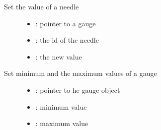 \documentclass[letterpaper,10pt,english]{sphinxmanual}
\begin{document}

\begin{fulllineitems}
\label{\detokenize{object-types/gauge:_CPPv418lv_gauge_set_valueP8lv_obj_t7uint8_t7int16_t}}%
\pysigstartmultiline
{}\label{\detokenize{object-types/gauge:lv__gauge_8h_1aa3847d9ed79b0bfeada84ff2b1029de3}}%
\pysigstopmultiline
Set the value of a needle \begin{description}
\item[{}] \leavevmode\begin{itemize}
\item {} 
: pointer to a gauge 

\item {} 
: the id of the needle 

\item {} 
: the new value 

\end{itemize}

\end{description}


\end{fulllineitems}


\begin{fulllineitems}
\label{\detokenize{object-types/gauge:_CPPv418lv_gauge_set_rangeP8lv_obj_t7int16_t7int16_t}}%
\pysigstartmultiline
{}\label{\detokenize{object-types/gauge:lv__gauge_8h_1a5b7ef1530753017b52c451d8ed562589}}%
\pysigstopmultiline
Set minimum and the maximum values of a gauge \begin{description}
\item[{}] \leavevmode\begin{itemize}
\item {} 
: pointer to he gauge object 

\item {} 
: minimum value 

\item {} 
: maximum value 

\end{itemize}

\end{description}


\end{fulllineitems}
\end{document}
